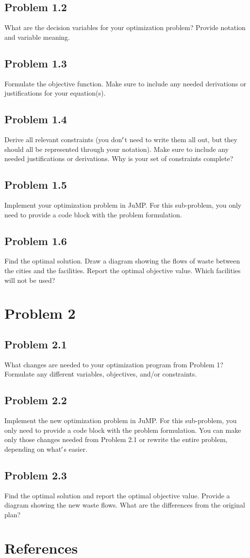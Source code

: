\documentclass[12pt,a4paper]{article}
\begin{document}
\subsection{Problem 1.2}
What are the decision variables for your optimization problem? Provide notation and variable meaning.

\subsection{Problem 1.3}
Formulate the objective function. Make sure to include any needed derivations or justifications for your equation(s).

\subsection{Problem 1.4}
Derive all relevant constraints (you don\ensuremath{\rq}t need to write them all out, but they should all be represented through your notation). Make sure to include any needed justifications or derivations. Why is your set of constraints complete?

\subsection{Problem 1.5}
Implement your optimization problem in JuMP. For this sub-problem, you only need to provide a code block with the problem formulation.

\subsection{Problem 1.6}
Find the optimal solution. Draw a diagram showing the flows of waste between the cities and the facilities. Report the optimal objective value. Which facilities will not be used?

\section{Problem 2}
\subsection{Problem 2.1}
What changes are needed to your optimization program from Problem 1? Formulate any different variables, objectives, and/or constraints.

\subsection{Problem 2.2}
Implement the new optimization problem in JuMP. For this sub-problem, you only need to provide a code block with the problem formulation. You can make only those changes needed from Problem 2.1 or rewrite the entire problem, depending on what\ensuremath{\rq}s easier.

\subsection{Problem 2.3}
Find the optimal solution and report the optimal objective value. Provide a diagram showing the new waste flows. What are the differences from the original plan?

\section{References}
\end{document}
